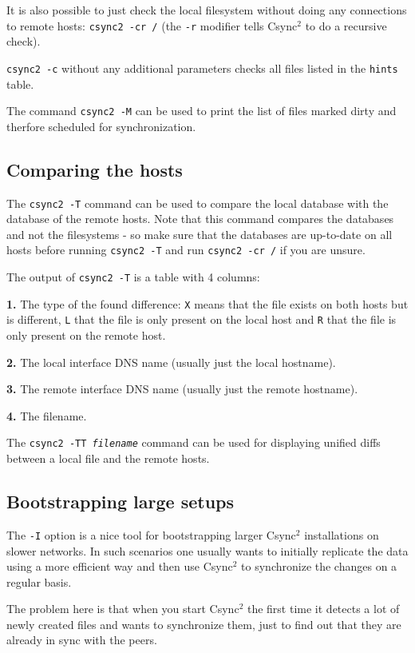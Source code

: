 \documentclass[a4paper,twocolumn]{article}
\def\csync2{{\sc Csync$^{2}$}}
\begin{document}
It is also possible to just check the local filesystem without doing any
connections to remote hosts: {\tt csync2 -cr /} (the {\tt -r} modifier
tells \csync2 to do a recursive check).

{\tt csync2 -c} without any additional parameters checks all files listed
in the {\tt hints} table.

The command {\tt csync2 -M} can be used to print the list of files marked dirty
and therfore scheduled for synchronization.

\subsection{Comparing the hosts}

The {\tt csync2 -T} command can be used to compare the local database with the
database of the remote hosts. Note that this command compares the databases and
not the filesystems - so make sure that the databases are up-to-date on all
hosts before running {\tt csync2 -T} and run {\tt csync2 -cr /} if you are
unsure.

The output of {\tt csync2 -T} is a table with 4 columns:

{\bf 1.} The type of the found difference: {\tt X} means that the file exists
on both hosts but is different, {\tt L} that the file is only present on the
local host and {\tt R} that the file is only present on the remote host.

{\bf 2.} The local interface DNS name (usually just the local hostname).

{\bf 3.} The remote interface DNS name (usually just the remote hostname).

{\bf 4.} The filename.

The {\tt csync2 -TT {\it filename}} command can be used for displaying unified
diffs between a local file and the remote hosts.

\subsection{Bootstrapping large setups}

The {\tt -I} option is a nice tool for bootstrapping larger \csync2
installations on slower networks. In such scenarios one usually wants to
initially replicate the data using a more efficient way and then use \csync2 to
synchronize the changes on a regular basis.

The problem here is that when you start \csync2 the first time it detects a lot
of newly created files and wants to synchronize them, just to find out that
they are already in sync with the peers.
\end{document}

